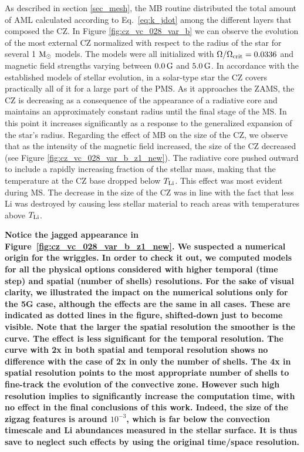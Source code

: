 \documentclass[fleqn,usenatbib]{mnras}
\begin{document}
As described in section \ref{sec_mesh}, the MB routine distributed the total amount of AML calculated according to Eq.~\ref{eq:k_jdot} among the different layers that composed the CZ. In Figure \ref{fig:cz_vc_028_var_b} we can observe the evolution of the most external CZ normalized with respect to the radius of the star for several 1 $\mathrm{M}_\odot$ models. The models were all initialized with $\Omega / \Omega_{\mathrm{crit}}=0.0336$ and magnetic field strengths varying between $0.0\,\mathrm{G}$ and $5.0\,\mathrm{G}$. In accordance with the established models of stellar evolution, in a solar-type star the CZ covers practically all of it for a large part of the PMS. As it approaches the ZAMS, the CZ is decreasing as a consequence of the appearance of a radiative core and maintains an approximately constant radius until the final stage of the MS. In this point it increases significantly as a response to the generalized expansion of the star's radius. Regarding the effect of MB on the size of the CZ, we observe that as the intensity of the magnetic field increased, the size of the CZ decreased (see Figure \ref{fig:cz_vc_028_var_b_z1_new}). The radiative core pushed outward to include a rapidly increasing fraction of the stellar mass, making that the temperature at the CZ base dropped below $T_{\mathrm{Li}}$. This effect was most evident during MS. The decrease in the size of the CZ was in line with the fact that less Li was destroyed by causing less stellar material to reach areas with temperatures above $T_{\mathrm{Li}}$.\par

\textbf{Notice the jagged appearance in Figure~\ref{fig:cz_vc_028_var_b_z1_new}. We suspected a numerical origin for the wriggles. In order to check it out, we computed models for all the physical options considered with higher temporal (time step) and spatial (number of shells) resolutions. For the sake of visual clarity, we illustrated the impact on the numerical solutions only for the 5G case, although the effects are the same in all cases. These are indicated as dotted lines in the figure, shifted-down just to become visible. Note that the larger the spatial resolution the smoother is the curve. The effect is less significant for the temporal resolution. The curve with 2x in both spatial and temporal resolution shows no difference with the case of 2x in only the number of shells. The 4x in spatial resolution points to the most appropriate number of shells to fine-track the evolution of the convective zone. However such high resolution implies to significantly increase the computation time, with no effect in the final conclusions of this work. Indeed, the size of the zigzag features is around $10^{-3}$,  which is far below the convection timescale and Li abundances measured in the stellar surface. It is thus save to neglect such effects by using the original time/space resolution.}
\end{document}
